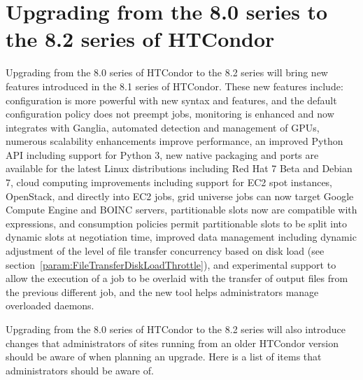 \section{\label{sec:to-8.2}Upgrading from the 8.0 series to the 8.2 series of HTCondor}

Upgrading from the 8.0 series of HTCondor to the 8.2 series 
will bring new features introduced in the 8.1 series of HTCondor.
These new features include:
configuration is more powerful with new syntax and features, and
the default configuration policy does not preempt jobs,
monitoring is enhanced and now integrates with Ganglia,
automated detection and management of GPUs,
numerous scalability enhancements improve performance,
an improved Python API including support for Python 3,
new native packaging and ports are available for the latest Linux 
distributions including Red Hat 7 Beta and Debian 7,
cloud computing improvements including support for
EC2 spot instances, OpenStack, and  
directly into EC2 jobs,
grid universe jobs can now target Google Compute Engine and BOINC servers,
partitionable slots now are compatible with  
expressions, and consumption policies permit partitionable slots 
to be split into dynamic slots at negotiation time,
improved data management including dynamic adjustment of the level of 
file transfer concurrency based on disk load 
(see section~\ref{param:FileTransferDiskLoadThrottle}), 
and experimental support to allow the execution of a job to be overlaid 
with the transfer of output files from the previous different job,
and
the new  tool helps administrators manage overloaded daemons. 

Upgrading from the 8.0 series of HTCondor to the 8.2 series will
also introduce changes that administrators of sites running from an older
HTCondor version should be aware of when planning an upgrade.  
Here is a list of items that administrators should be aware of.

